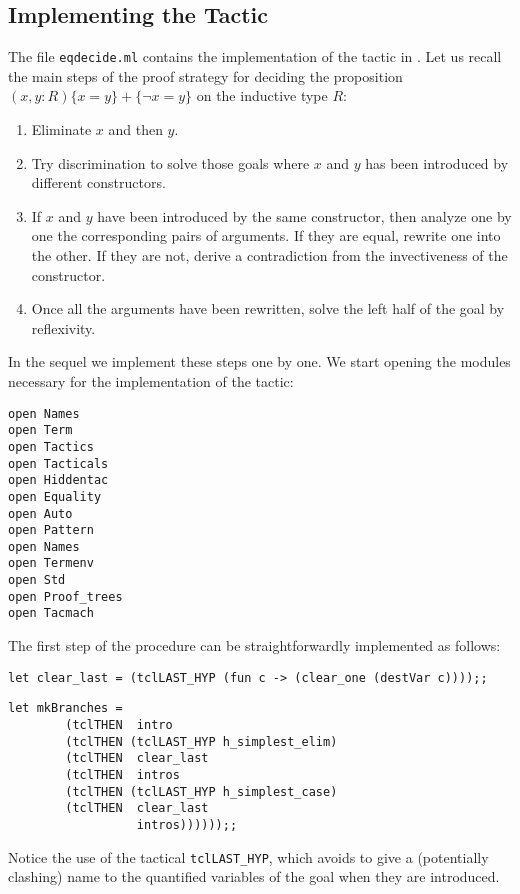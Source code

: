 \subsection{Implementing the Tactic}

The file \texttt{eqdecide.ml} contains the implementation of the
tactic in \ocaml{}. Let us recall the main steps of the proof strategy
for deciding the proposition $(x,y:R)\{x=y\}+\{\neg x=y\}$ on the
inductive type $R$:
\begin{enumerate}
\item Eliminate $x$ and then $y$.
\item Try discrimination to solve those goals where $x$ and $y$ has
been introduced by different constructors.
\item If $x$ and $y$ have been introduced by the same constructor,
      then analyze one by one the corresponding pairs of arguments.
      If they are equal, rewrite one into the other. If they are
      not, derive a contradiction from the invectiveness of the
      constructor.
\item Once all the arguments have been rewritten, solve the left half
of the goal by reflexivity.
\end{enumerate}

In the sequel we implement these steps one by one. We start opening
the modules necessary for the implementation of the tactic:

\begin{verbatim}
open Names
open Term
open Tactics
open Tacticals
open Hiddentac
open Equality
open Auto
open Pattern
open Names
open Termenv
open Std
open Proof_trees
open Tacmach
\end{verbatim}

The first step of the procedure can be straightforwardly implemented as
follows:

\begin{verbatim}
let clear_last = (tclLAST_HYP (fun c -> (clear_one (destVar c))));;
\end{verbatim}

\begin{verbatim}
let mkBranches = 
        (tclTHEN  intro 
        (tclTHEN (tclLAST_HYP h_simplest_elim)
        (tclTHEN  clear_last
        (tclTHEN  intros 
        (tclTHEN (tclLAST_HYP h_simplest_case)
        (tclTHEN  clear_last
                  intros))))));;
\end{verbatim}

Notice the use of the tactical \texttt{tclLAST\_HYP}, which avoids to
give a (potentially clashing) name to the quantified variables of the
goal when they are introduced.

